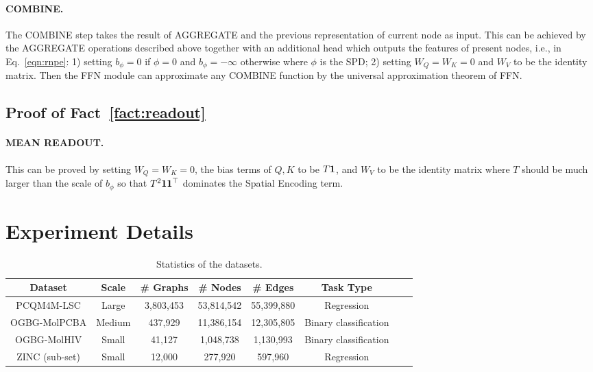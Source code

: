 \documentclass{article}
\begin{document}
\paragraph{COMBINE.} The COMBINE step takes the result of AGGREGATE and the previous representation of current node as input. This can be achieved by the AGGREGATE operations described above together with an additional head which outputs the features of present nodes, i.e., in Eq.~\eqref{eqn:rnpe}: 1) setting $b_\phi = 0$ if $\phi = 0$ and $b_\phi = -\infty$ otherwise where $\phi$ is the SPD; 2) setting $W_Q = W_K = 0$ and $W_V$ to be the identity matrix. Then the FFN module can approximate any COMBINE function by the universal approximation theorem of FFN.
\subsection{Proof of Fact~\ref{fact:readout}}
\paragraph{MEAN READOUT.} This can be proved by setting $W_Q = W_K = 0$, the bias terms of $Q, K$ to be $T\mathbf{1}$, and $W_V$ to be the identity matrix where $T$ should be much larger than the scale of $b_\phi$ so that $T^2\mathbf{1}\mathbf{1}^\top$ dominates the Spatial Encoding term.


\section{Experiment Details}



\begin{table}[ht]
\caption{Statistics of the datasets.}
\centering\label{tab:datasets}
\begin{tabular}{cccccccc}
\toprule
Dataset     & Scale & \# Graphs & \# Nodes & \# Edges & Task Type  \\ \hline
PCQM4M-LSC  & Large & 3,803,453 & 53,814,542	& 55,399,880 & Regression  \\ \hline
OGBG-MolPCBA & Medium & 437,929   & 11,386,154& 12,305,805& Binary classification \\ \hline
OGBG-MolHIV & Small & 41,127	& 1,048,738 & 1,130,993 & Binary classification \\ \hline
ZINC (sub-set) & Small & 12,000  & 277,920 & 597,960 & Regression \\
\bottomrule
\end{tabular}
\end{table}
\end{document}

